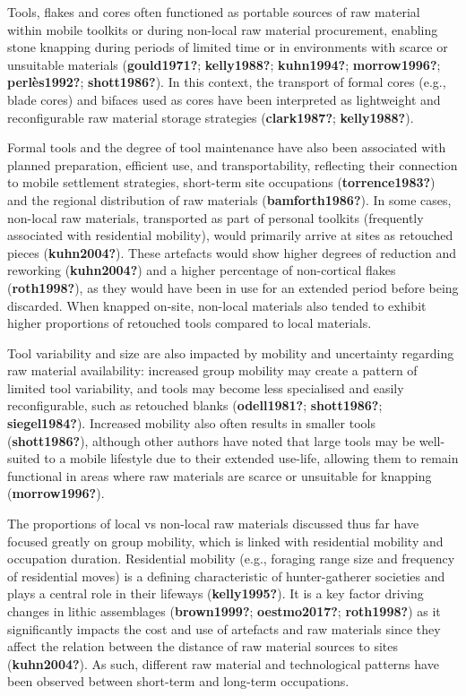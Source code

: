 \documentclass[
  a4paper,
  DIV=11,
  numbers=noendperiod]{scrreprt}
\begin{document}
Tools, flakes and cores often functioned as portable sources of raw
material within mobile toolkits or during non-local raw material
procurement, enabling stone knapping during periods of limited time or
in environments with scarce or unsuitable materials
(\textbf{gould1971?}; \textbf{kelly1988?}; \textbf{kuhn1994?};
\textbf{morrow1996?}; \textbf{perlès1992?}; \textbf{shott1986?}). In
this context, the transport of formal cores (e.g., blade cores) and
bifaces used as cores have been interpreted as lightweight and
reconfigurable raw material storage strategies (\textbf{clark1987?};
\textbf{kelly1988?}).

Formal tools and the degree of tool maintenance have also been
associated with planned preparation, efficient use, and
transportability, reflecting their connection to mobile settlement
strategies, short-term site occupations (\textbf{torrence1983?}) and the
regional distribution of raw materials (\textbf{bamforth1986?}). In some
cases, non-local raw materials, transported as part of personal toolkits
(frequently associated with residential mobility), would primarily
arrive at sites as retouched pieces (\textbf{kuhn2004?}). These
artefacts would show higher degrees of reduction and reworking
(\textbf{kuhn2004?}) and a higher percentage of non-cortical flakes
(\textbf{roth1998?}), as they would have been in use for an extended
period before being discarded. When knapped on-site, non-local materials
also tended to exhibit higher proportions of retouched tools compared to
local materials.

Tool variability and size are also impacted by mobility and uncertainty
regarding raw material availability: increased group mobility may create
a pattern of limited tool variability, and tools may become less
specialised and easily reconfigurable, such as retouched blanks
(\textbf{odell1981?}; \textbf{shott1986?}; \textbf{siegel1984?}).
Increased mobility also often results in smaller tools
(\textbf{shott1986?}), although other authors have noted that large
tools may be well-suited to a mobile lifestyle due to their extended
use-life, allowing them to remain functional in areas where raw
materials are scarce or unsuitable for knapping (\textbf{morrow1996?}).

The proportions of local vs non-local raw materials discussed thus far
have focused greatly on group mobility, which is linked with residential
mobility and occupation duration. Residential mobility (e.g., foraging
range size and frequency of residential moves) is a defining
characteristic of hunter-gatherer societies and plays a central role in
their lifeways (\textbf{kelly1995?}). It is a key factor driving changes
in lithic assemblages (\textbf{brown1999?}; \textbf{oestmo2017?};
\textbf{roth1998?}) as it significantly impacts the cost and use of
artefacts and raw materials since they affect the relation between the
distance of raw material sources to sites (\textbf{kuhn2004?}). As such,
different raw material and technological patterns have been observed
between short-term and long-term occupations.
\end{document}
